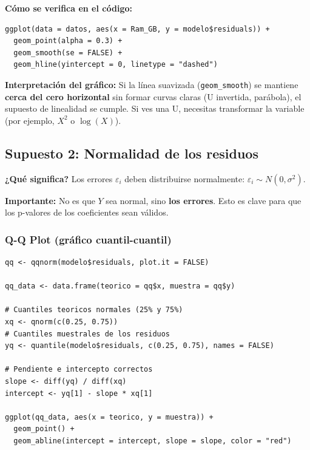 \documentclass[12pt,a4paper]{article}
\begin{document}
\textbf{Cómo se verifica en el código:}
\begin{lstlisting}[caption={Gráficos de residuos vs variables para linealidad}]
ggplot(data = datos, aes(x = Ram_GB, y = modelo$residuals)) +
  geom_point(alpha = 0.3) +
  geom_smooth(se = FALSE) +
  geom_hline(yintercept = 0, linetype = "dashed")
\end{lstlisting}

\textbf{Interpretación del gráfico:} Si la línea suavizada (\texttt{geom\_smooth}) se mantiene \textbf{cerca del cero horizontal} sin formar curvas claras (U invertida, parábola), el supuesto de linealidad se cumple. Si ves una U, necesitas transformar la variable (por ejemplo, $X^2$ o $\log(X)$).

\subsection{Supuesto 2: Normalidad de los residuos}

\textbf{¿Qué significa?} Los errores $\varepsilon_i$ deben distribuirse normalmente: $\varepsilon_i \sim N(0, \sigma^2)$.

\textbf{Importante:} No es que $Y$ sea normal, sino \textbf{los errores}. Esto es clave para que los p-valores de los coeficientes sean válidos.

\subsubsection{Q-Q Plot (gráfico cuantil-cuantil)}

\begin{lstlisting}[caption={Q-Q Plot manual corregido}]
qq <- qqnorm(modelo$residuals, plot.it = FALSE)

qq_data <- data.frame(teorico = qq$x, muestra = qq$y)

# Cuantiles teoricos normales (25% y 75%)
xq <- qnorm(c(0.25, 0.75))
# Cuantiles muestrales de los residuos
yq <- quantile(modelo$residuals, c(0.25, 0.75), names = FALSE)

# Pendiente e intercepto correctos
slope <- diff(yq) / diff(xq)
intercept <- yq[1] - slope * xq[1]

ggplot(qq_data, aes(x = teorico, y = muestra)) +
  geom_point() +
  geom_abline(intercept = intercept, slope = slope, color = "red")
\end{lstlisting}
\end{document}
